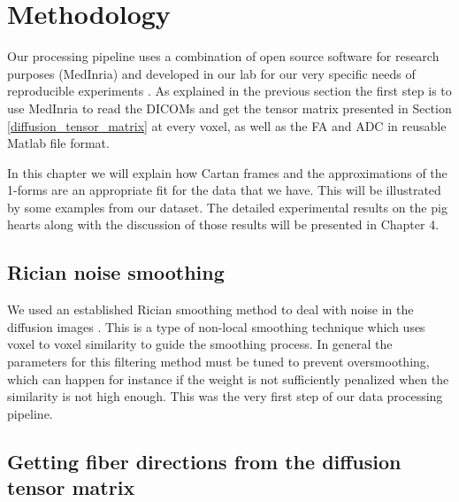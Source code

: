 \chapter{Methodology}

Our processing pipeline uses a combination of open source software for research purposes (MedInria) and developed in our lab for our very specific needs of reproducible experiments \cite{piuzephd}. As explained in the previous section the first step is to use MedInria to read the DICOMs and get the tensor matrix presented in Section \ref{diffusion_tensor_matrix} at every voxel, as well as the FA and ADC in reusable Matlab file format.

In this chapter we will explain how Cartan frames and the approximations of the 1-forms are an appropriate fit for the data that we have. This will be illustrated by some examples from our dataset. The detailed experimental results on the pig hearts along with the discussion of those results will be presented in Chapter 4.

\section{Rician noise smoothing}

We used an established Rician smoothing method to deal with noise in the diffusion images \cite{wiest2008rician}. This is a type of non-local smoothing technique which uses voxel to voxel similarity to guide the smoothing process. In general the parameters for this filtering method must be tuned to prevent oversmoothing, which can happen for instance if the weight is not sufficiently penalized when the similarity is not high enough. This was the very first step of our data processing pipeline.

\section{Getting fiber directions from the diffusion tensor matrix}

